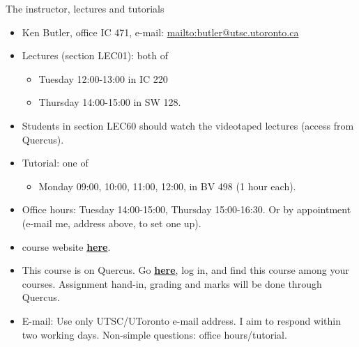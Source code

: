 \documentclass[ignorenonframetext,]{beamer}
\providecommand{\tightlist}{%
  \setlength{\itemsep}{0pt}\setlength{\parskip}{0pt}}
\begin{document}
\begin{frame}{The instructor, lectures and tutorials}
\protect\hypertarget{the-instructor-lectures-and-tutorials}{}

\begin{itemize}
\tightlist
\item
  Ken Butler, office IC 471, e-mail:
  \url{mailto:butler@utsc.utoronto.ca}
\item
  Lectures (section LEC01): both of

  \begin{itemize}
  \tightlist
  \item
    Tuesday 12:00-13:00 in IC 220
  \item
    Thursday 14:00-15:00 in SW 128.
  \end{itemize}
\item
  Students in section LEC60 should watch the videotaped lectures (access
  from Quercus).
\item
  Tutorial: one of

  \begin{itemize}
  \tightlist
  \item
    Monday 09:00, 10:00, 11:00, 12:00, in BV 498 (1 hour each).
  \end{itemize}
\item
  Office hours: Tuesday 14:00-15:00, Thursday 15:00-16:30. Or by
  appointment (e-mail me, address above, to set one up).
\item
  course website \href{http://ritsokiguess.site/STAC33}{\textbf{here}}.
\item
  This course is on Quercus. Go
  \href{http://q.utoronto.ca}{\textbf{here}}, log in, and find this
  course among your courses. Assignment hand-in, grading and marks will
  be done through Quercus.
\item
  E-mail: Use only UTSC/UToronto e-mail address. I aim to respond within
  two working days. Non-simple questions: office hours/tutorial.
\end{itemize}

\end{frame}
\end{document}
